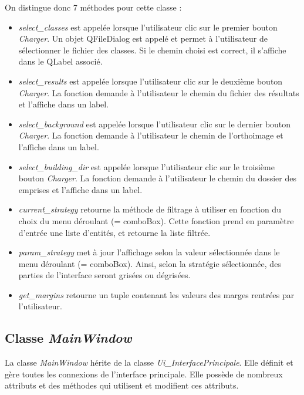 \noindent On distingue donc 7 méthodes pour cette classe :
\begin{itemize}[label=$\rightarrow$]
	\item \textit{select\_classes} est appelée lorsque l'utilisateur clic sur le premier bouton \textit{Charger}. Un objet QFileDialog est appelé et permet à l'utilisateur de sélectionner le fichier des classes. Si le chemin choisi est correct, il s'affiche dans le QLabel associé.
	\item \textit{select\_results} est appelée lorsque l'utilisateur clic sur le deuxième bouton \textit{Charger}. La fonction demande à l'utilisateur le chemin du fichier des résultats et l'affiche dans un label.
	\item \textit{select\_background} est appelée lorsque l'utilisateur clic sur le dernier bouton \textit{Charger}. La fonction demande à l'utilisateur le chemin de l'orthoimage et l'affiche dans un label.
	\item \textit{select\_building\_dir} est appelée lorsque l'utilisateur clic sur le troisième bouton \textit{Charger}. La fonction demande à l'utilisateur le chemin du dossier des emprises et l'affiche dans un label.
	\item \textit{current\_strategy} retourne la méthode de filtrage à utiliser en fonction du choix du menu déroulant (= comboBox). Cette fonction prend en paramètre d'entrée une liste d'entités, et retourne la liste filtrée.
	\item \textit{param\_strategy} met à jour l'affichage selon la valeur sélectionnée dans le menu déroulant (= comboBox). Ainsi, selon la stratégie sélectionnée, des parties de l'interface seront grisées ou dégrisées.
	\item \textit{get\_margins} retourne un tuple contenant les valeurs des marges rentrées par l'utilisateur.\\
\end{itemize}

\subsection{Classe \textit{MainWindow}}

La classe \textit{MainWindow} hérite de la classe \textit{Ui\_InterfacePrincipale}. Elle définit et gère toutes les connexions de l'interface principale. Elle possède de nombreux attributs et des méthodes qui utilisent et modifient ces attributs.\\
\newpage

